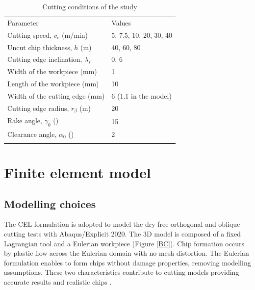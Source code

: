 \documentclass[final,5p,times,twocolumn]{elsarticle}
\begin{document}
%
\begin{table}[!h]
\begin{center}
\caption{\label{tab:CutCond} Cutting conditions of the study}
\begin{tabular}{ll}
\hline\noalign{\smallskip}
Parameter  & Values\\
\noalign{\smallskip}\hline\noalign{\smallskip}
Cutting speed, $v_c$ (m/min) & 5, 7.5, 10, 20, 30, 40\\
Uncut chip thickness, $h$ (\textmu{}m) & 40, 60, 80\\
Cutting edge inclination, $\lambda_s$ & 0, 6\\
Width of the workpiece (mm) & 1\\
Length of the workpiece (mm) & 10\\
Width of the cutting edge (mm) & 6 (1.1 in the model)\\
Cutting edge radius, $r_\beta$ (\textmu{}m) & 20\\
Rake angle, $\gamma_0$ (\textdegree{}) & 15\\
Clearance angle, $\alpha_0$ (\textdegree{}) & 2\\
\noalign{\smallskip}\hline
\end{tabular}
\end{center}
\end{table}
%

\section{Finite element model}
\label{FEM}

\subsection{Modelling choices}

The CEL formulation is adopted to model the dry free orthogonal and oblique cutting tests with Abaqus/Explicit 2020. The 3D model is composed of a fixed Lagrangian tool and a Eulerian workpiece (Figure \ref{BC}). Chip formation occurs by plastic flow across the Eulerian domain with no mesh distortion. The Eulerian formulation enables to form chips without damage properties, removing modelling assumptions. These two characteristics contribute to cutting models providing accurate results and realistic chips \cite{ducobu_application_2016}.
\end{document}
